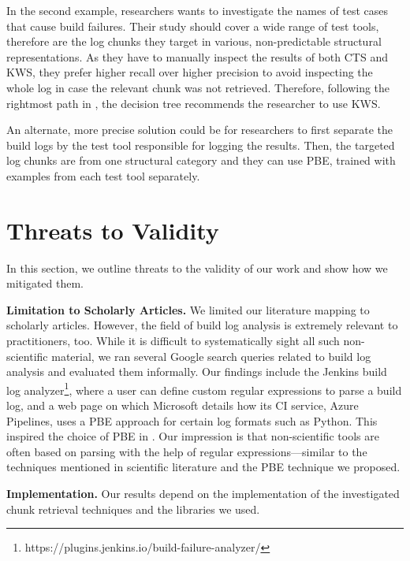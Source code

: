 In the second example, researchers wants to investigate the names
of test cases that cause build failures.
Their study should cover a wide range of test tools, therefore are the
log chunks they target in various, non-predictable structural
representations.
As they have to manually inspect the results of both CTS
and KWS, they prefer higher recall over higher precision to
avoid inspecting
the whole log in case the relevant chunk was not retrieved.
Therefore, following the rightmost path in
,
the decision tree recommends the researcher to use KWS\@.

An alternate, more precise solution
could be for researchers to first separate the build logs by the
test tool responsible for logging the results.
Then, the
targeted log chunks are from one structural category and they can use
PBE, trained with examples from each test tool separately.


\section{Threats to Validity}
In this section, we outline threats to the validity of our work and
show how we mitigated them.

\textbf{Limitation to Scholarly Articles.} We limited our literature
mapping to scholarly articles.
However, the field of build log analysis is extremely relevant to
practitioners, too.
While it is difficult to systematically sight all such non-scientific
material, we ran several Google search queries related to build log
analysis and evaluated them informally.
Our findings include the Jenkins build log
analyzer\footnote{https://plugins.jenkins.io/build-failure-analyzer/}, where a user can
define custom regular expressions to parse a build log, and a web page
on which Microsoft details how its CI service, Azure Pipelines, uses a
PBE approach for certain log formats such as Python.
This inspired the choice of PBE in .
Our impression is that non-scientific tools are often based on
parsing with the help of regular expressions---similar to the
techniques mentioned in scientific literature and the PBE technique
we proposed.

\textbf{Implementation.}
Our results depend on the implementation of the investigated chunk
retrieval techniques and the libraries we used.

